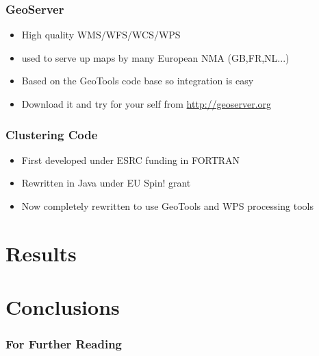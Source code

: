 \documentclass{beamer}
\begin{document}
\begin{frame}[t]
\frametitle{GeoServer}
\begin{itemize}
\item High quality WMS/WFS/WCS/WPS
\item used to serve up maps by many European NMA (GB,FR,NL...)
\item Based on the GeoTools code base so integration is easy
\item Download it and try for your self from \url{http://geoserver.org}
\end{itemize}
\end{frame}

\begin{frame}[t]
\frametitle{Clustering Code}
\begin{itemize}
\item First developed under ESRC funding in FORTRAN
\item Rewritten in Java under EU Spin! grant
\item Now completely rewritten to use GeoTools and WPS processing tools
\end{itemize}
\end{frame}

\section{Results}
\begin{frame}[t]
\frametitle{}
\end{frame}

\section{Conclusions}
\begin{frame}[t]
\frametitle{}
\end{frame}


\begin{frame}[allowframebreaks]
  \frametitle<presentation>{For Further Reading}
    

\end{frame}
\end{document}
